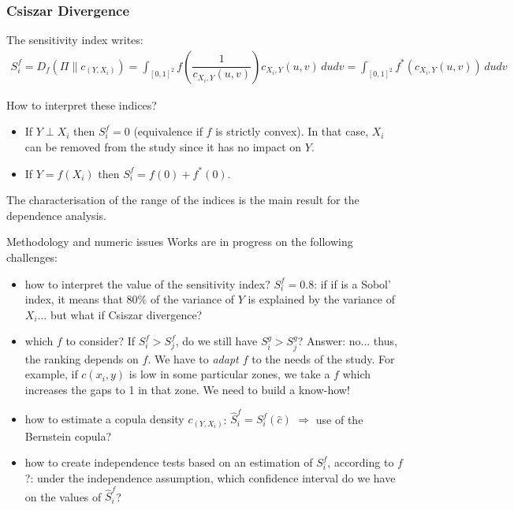 \documentclass[8pt]{beamer}
\begin{document}
\begin{frame}
  \frametitle{Csiszar Divergence}
\small
The sensitivity index writes:
    \begin{align*}
      S_i^f= D_f(\Pi \| c_{(Y,X_i)}) = \int_{[0,1]^2}f\left(\dfrac{1}{c_{X_i,Y}(u,v)}\right)c_{X_i,Y}(u,v)\,dudv=\int_{[0,1]^2}f^*\left(c_{X_i,Y}(u,v)\right)\,dudv
    \end{align*}

  \begin{block}{How to interpret these indices?}
  \begin{itemize}
   \item \alert{If $Y \perp X_i$ then $S_i^f=0$}  (equivalence if $f$ is strictly convex). In that case, $X_i$ can be removed from the study since it has no impact on  $Y$.
   \item \alert{If $Y=f(X_i)$ then $S_i^f = f(0) + f^*(0)$}.
  \end{itemize}
The characterisation of the range of the indices is the main result for the dependence analysis.
  \end{block}

  \begin{block}{Methodology and numeric issues}
   Works are in progress on the following challenges: 
    \begin{itemize}
    \item \alert{how to interpret the value of the sensitivity index?} $S_i^f=0.8$: if if is a Sobol' index, it means that $80\%$ of the variance of $Y$ is explained by the variance of $X_i$... but what if Csiszar divergence?
    \item \alert{which  $f$ to consider?} If $S_i^{f} > S_j^{f}$, do we still have $S_i^{g} > S_j^{g}$? Answer: no... thus, the ranking depends on $f$. We have to \emph{adapt $f$} to the needs of the study. For example, if $c(x_i, y)$ is low in some particular zones, we take a $f$ which increases the gaps to 1 in that zone. We need to build a know-how!
      \item \alert{how to estimate a copula density $c_{(Y,X_i)}$}:  $\hat{S}_i^f = S_i^f(\hat{c})$ $\Longrightarrow$ use of the Bernstein copula?
     \item \alert{how to create independence tests} based on an estimation of $S_i^f$, according to $f$?: under the independence assumption, which confidence interval do we have on the values of $\hat{S}_i^f$?
    \end{itemize}

  \end{block}

\end{frame}
\end{document}
